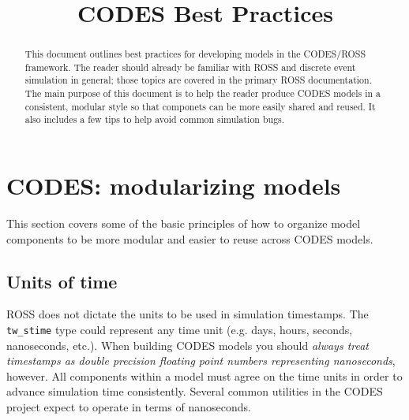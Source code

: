 \documentclass[conference,10pt,compsocconf,onecolumn]{IEEEtran}
\begin{document}
\title{CODES Best Practices}





\renewcommand{\thetable}{\arabic{table}}

\maketitle

\begin{abstract}
This document outlines best practices for developing models in the
CODES/ROSS framework.  The reader should already be familiar with ROSS
and discrete event simulation in general; those topics are covered in the primary
ROSS documentation.
%
The main purpose of this document is to help the reader produce
CODES models in a consistent, modular style so that componets can be more
easily shared and reused.  It also includes a few tips to help avoid common
simulation bugs.
\end{abstract}

\section{CODES: modularizing models}

This section covers some of the basic principles of how to organize model
components to be more modular and easier to reuse across CODES models.

\subsection{Units of time}

ROSS does not dictate the units to be used in simulation timestamps.
The \texttt{tw\_stime} type could represent any time unit
(e.g. days, hours, seconds, nanoseconds, etc.).  When building CODES
models you should \emph{always treat timestamps as double precision floating
point numbers representing nanoseconds}, however.
All components within a model must agree on the time units in order to
advance simulation time consistently.  Several common utilities in the
CODES project expect to operate in terms of nanoseconds.
\end{document}
